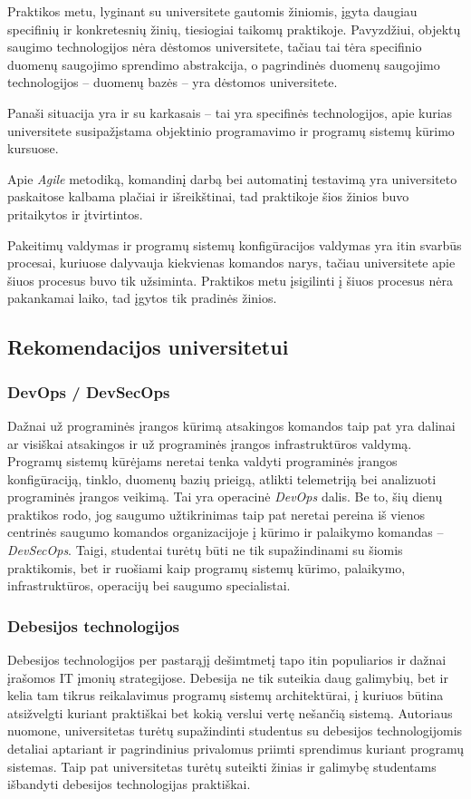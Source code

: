 Praktikos metu, lyginant su universitete gautomis žiniomis, įgyta daugiau specifinių ir konkretesnių žinių, tiesiogiai taikomų praktikoje. Pavyzdžiui, objektų saugimo technologijos nėra dėstomos universitete, tačiau tai tėra specifinio duomenų saugojimo sprendimo abstrakcija, o pagrindinės duomenų saugojimo technologijos -- duomenų bazės -- yra dėstomos universitete.

Panaši situacija yra ir su karkasais -- tai yra specifinės technologijos, apie kurias universitete susipažįstama objektinio programavimo ir programų sistemų kūrimo kursuose.

Apie \textit{Agile} metodiką, komandinį darbą bei automatinį testavimą yra universiteto paskaitose kalbama plačiai ir išreikštinai, tad praktikoje šios žinios buvo pritaikytos ir įtvirtintos. 

Pakeitimų valdymas ir programų sistemų konfigūracijos valdymas yra itin svarbūs procesai, kuriuose dalyvauja kiekvienas komandos narys, tačiau universitete apie šiuos procesus buvo tik užsiminta. Praktikos metu įsigilinti į šiuos procesus nėra pakankamai laiko, tad įgytos tik pradinės žinios.

\subsection{Rekomendacijos universitetui}

\subsubsection*{DevOps / DevSecOps}

Dažnai už programinės įrangos kūrimą atsakingos komandos taip pat yra dalinai ar visiškai atsakingos ir už programinės įrangos infrastruktūros valdymą. Programų sistemų kūrėjams neretai tenka valdyti programinės įrangos konfigūraciją, tinklo, duomenų bazių prieigą, atlikti telemetriją bei analizuoti programinės įrangos veikimą. Tai yra operacinė \textit{DevOps} dalis. Be to, šių dienų praktikos rodo, jog saugumo užtikrinimas taip pat neretai pereina iš vienos centrinės saugumo komandos organizacijoje į kūrimo ir palaikymo komandas -- \textit{DevSecOps}. Taigi, studentai turėtų būti ne tik supažindinami su šiomis praktikomis, bet ir ruošiami kaip programų sistemų kūrimo, palaikymo, infrastruktūros, operacijų bei saugumo specialistai. 

\subsubsection*{Debesijos technologijos}

Debesijos  technologijos per pastarąjį dešimtmetį tapo itin populiarios ir dažnai įrašomos IT įmonių strategijose. Debesija ne tik suteikia daug galimybių, bet ir kelia tam tikrus reikalavimus programų sistemų architektūrai, į kuriuos būtina atsižvelgti kuriant praktiškai bet kokią verslui vertę nešančią sistemą. Autoriaus nuomone, universitetas turėtų supažindinti studentus su debesijos technologijomis detaliai aptariant ir pagrindinius privalomus priimti sprendimus kuriant programų sistemas. Taip pat universitetas turėtų suteikti žinias ir galimybę studentams išbandyti debesijos technologijas praktiškai.